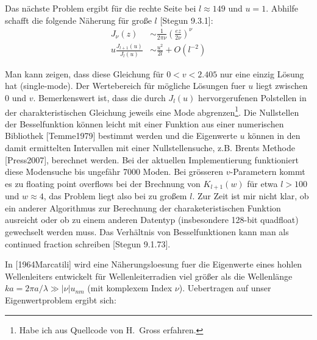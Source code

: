 \documentclass[DIV19,twocolumn]{scrartcl}
\def\({\left(}
\def\){\right)}
\begin{document}
Das n\"achste Problem ergibt f\"ur die rechte Seite bei $l\approx 149$
und $u=1$. Abhilfe schafft die folgende N\"aherung f\"ur gro\ss e $l$
[Stegun 9.3.1]:
\begin{align}
  J_\nu(z)&\sim \frac{1}{2\pi\nu}\(\frac{ez}{2\nu}\)^\nu \\
  u\frac{J_{l+1}(u)}{J_l(u)} &\sim \frac{u^2}{2l} + O(l^{-2})
\end{align}


Man kann zeigen, dass diese Gleichung f\"ur $0<v<2.405$ nur eine
einzig L\"osung hat (single-mode). Der Wertebereich f\"ur m\"ogliche
L\"osungen fuer $u$ liegt zwischen 0 und $v$. Bemerkenswert ist, dass
die durch $J_l(u)$ hervorgerufenen Polstellen in der
charakteristischen Gleichung jeweils eine Mode abgrenzen\footnote{Habe
  ich aus Quellcode von H.~Gross erfahren.}. Die Nullstellen der
Besselfunktion k\"onnen leicht mit einer Funktion aus einer
numerischen Bibliothek [Temme1979] bestimmt werden und die Eigenwerte
$u$ k\"onnen in den damit ermittelten Intervallen mit einer
Nullstellensuche, z.B. Brents Methode [Press2007], berechnet werden.
Bei der aktuellen Implementierung funktioniert diese Modensuche bis
ungef\"ahr 7000 Moden. Bei gr\"osseren $v$-Parametern kommt es zu
floating point overflows bei der Brechnung von $K_{l+1}(w)$ f\"ur etwa
$l>100$ und $w\approx 4$, das Problem liegt also bei zu gro\ss em
$l$. Zur Zeit ist mir nicht klar, ob ein anderer Algorithmus zur
Berechnung der charaketeristischen Funktion ausreicht oder ob zu einem
anderen Datentyp (insbesondere 128-bit quadfloat) gewechselt werden
muss. Das Verh\"altnis von Besselfunktionen kann man als continued
fraction schreiben [Stegun 9.1.73]. 

In [1964Marcatili] wird eine N\"aherungsloesung fuer die Eigenwerte
eines hohlen Wellenleiters entwickelt f\"ur Wellenleiterradien viel
gr\"o\ss er als die Wellenl\"ange $ka = 2\pi a/\lambda \gg |\nu|
u_{nm}$ (mit komplexem Index $\nu$). Uebertragen auf unser
Eigenwertproblem ergibt sich:
\end{document}
